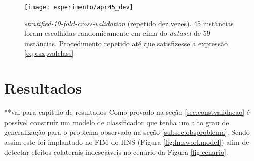 \begin{figure}[!htb] \centering 
  \centering
  \texttt{[image: experimento/apr45\_dev]} 
  \caption{\textit{stratified-10-fold-cross-validation} (repetido dez vezes). 45 instâncias foram escolhidas randomicamente em cima do \textit{dataset} de 59 instâncias. Procedimento repetido até que satisfizesse a expressão \ref{eq:esxpvalclass} } 
  \label{fig:apr45_dev}
\end{figure}

\section{Resultados} **vai para capitulo de resultados
\label{sec:resultados}
Como provado na seção \ref{sec:constvalidacao} é possível construir um modelo de classificador que tenha um alto grau de generalização para o problema observado na seção \ref{subsec:obsproblema}. Sendo assim este foi implantado no FIM do HNS (Figura \ref{fig:hnsworkmodel}) afim de detectar efeitos colaterais indesejáveis no cenário da Figura \ref{fig:cenario}.
